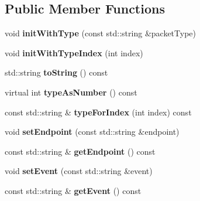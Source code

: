 \subsection*{Public Member Functions}
\begin{DoxyCompactItemize}
\item 
\mbox{\label{classnetwork_1_1SocketIOPacket_a2d8db928465c921f681980eca359bd11}} 
void {\bfseries init\+With\+Type} (const std\+::string \&packet\+Type)
\item 
\mbox{\label{classnetwork_1_1SocketIOPacket_a82f9c0486311c093b77e06b3f22d93e9}} 
void {\bfseries init\+With\+Type\+Index} (int index)
\item 
\mbox{\label{classnetwork_1_1SocketIOPacket_aded03ce6aa1fe6e9b0419cf984d6ed68}} 
std\+::string {\bfseries to\+String} () const
\item 
\mbox{\label{classnetwork_1_1SocketIOPacket_a0238913c0a97ea312966f5096b33e1cb}} 
virtual int {\bfseries type\+As\+Number} () const
\item 
\mbox{\label{classnetwork_1_1SocketIOPacket_a73ac34a4daca7bb0669a7b816d0cc9de}} 
const std\+::string \& {\bfseries type\+For\+Index} (int index) const
\item 
\mbox{\label{classnetwork_1_1SocketIOPacket_a63c3026303c6ff5e42540ba9c1e4cf11}} 
void {\bfseries set\+Endpoint} (const std\+::string \&endpoint)
\item 
\mbox{\label{classnetwork_1_1SocketIOPacket_a2331c57a68345a1ac88b373ac88b09d2}} 
const std\+::string \& {\bfseries get\+Endpoint} () const
\item 
\mbox{\label{classnetwork_1_1SocketIOPacket_ae67ca4a2967aaf0297aa115eaf564992}} 
void {\bfseries set\+Event} (const std\+::string \&event)
\item 
\mbox{\label{classnetwork_1_1SocketIOPacket_a420cbe758225310284fad3dad9f4123a}} 
const std\+::string \& {\bfseries get\+Event} () const

\end{DoxyCompactItemize}
